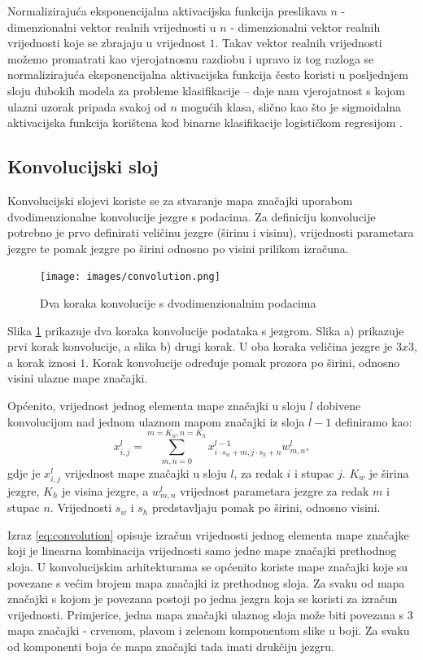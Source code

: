 \documentclass[times, utf8, diplomski, numeric]{fer}
\begin{document}
Normalizirajuća eksponencijalna aktivacijska funkcija preslikava $n$ - dimenzionalni vektor realnih vrijednosti u $n$ - dimenzionalni vektor realnih vrijednosti koje se zbrajaju u vrijednost $1$.
Takav vektor realnih vrijednosti možemo promatrati kao vjerojatnosnu razdiobu i upravo iz tog razloga se normalizirajuća eksponencijalna aktivacijska funkcija često koristi u posljednjem sloju dubokih modela za probleme klasifikacije -- daje nam vjerojatnost s kojom ulazni uzorak pripada svakoj od $n$ mogućih klasa, slično kao što je sigmoidalna aktivacijska funkcija korištena kod binarne klasifikacije logističkom regresijom \citep{seminar:rela}.

\subsection{Konvolucijski sloj}
Konvolucijski slojevi koriste se za stvaranje mapa značajki uporabom dvodimenzionalne konvolucije jezgre s podacima.
Za definiciju konvolucije potrebno je prvo definirati veličinu jezgre (širinu i visinu), vrijednosti parametara jezgre te pomak jezgre po širini odnosno po visini prilikom izračuna.
\begin{figure}[H]
\centering
\texttt{[image: images/convolution.png]}
\caption{Dva koraka konvolucije s dvodimenzionalnim podacima}
\label{img:convolution}
\end{figure}
Slika \ref{img:convolution} prikazuje dva koraka konvolucije podataka s jezgrom. Slika a) prikazuje prvi korak konvolucije, a slika b) drugi korak. 
U oba koraka veličina jezgre je $3x3$, a korak iznosi $1$. 
Korak konvolucije  određuje pomak prozora po širini, odnosno visini ulazne mape značajki. 

Općenito, vrijednost jednog elementa mape značajki u sloju $l$ dobivene konvolucijom nad jednom ulaznom mapom značajki iz sloja $l-1$ definiramo kao:
\begin{equation}
 x^l_{i,j}=\sum_{m,n=0}^{m=K_w,n=K_h}x^{l-1}_{i \cdot s_w +m, j \cdot s_h +n} w^l_{m, n}, \label{eq:convolution}
\end{equation}
gdje je $x_{i,j}^l$ vrijednost mape značajki u sloju $l$, za redak $i$ i stupac $j$. $K_w$ je širina jezgre, $K_h$ je visina jezgre, a $w^l_{m,n}$ vrijednost parametara jezgre za redak $m$ i stupac $n$.
Vrijednosti $s_w$ i $s_h$ predstavljaju pomak po širini, odnosno visini.

Izraz \ref{eq:convolution} opisuje izračun vrijednosti jednog elementa mape značajke koji je linearna kombinacija vrijednosti samo jedne mape značajki prethodnog sloja.
U konvolucijskim arhitekturama se općenito koriste mape značajki koje su povezane s većim brojem mapa značajki iz prethodnog sloja.
Za svaku od mapa značajki s kojom je povezana postoji po jedna jezgra koja se koristi za izračun vrijednosti.
Primjerice, jedna mapa značajki ulaznog sloja može biti povezana s 3 mapa značajki - crvenom, plavom i zelenom komponentom slike u boji.
Za svaku od komponenti boja će mapa značajki tada imati drukčiju jezgru.
\end{document}
